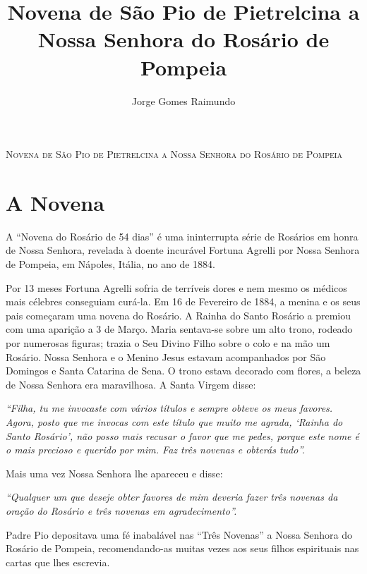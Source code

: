 \documentclass[10pt,twoside,a5paper]{article}
\title{Novena de São Pio de Pietrelcina a Nossa Senhora do Rosário de Pompeia}
\author{Jorge Gomes Raimundo}
\begin{document}
	
	
	\begin{center}\Large{\textsc{Novena de São Pio de Pietrelcina a Nossa Senhora do Rosário de Pompeia}}\bigskip\end{center}
	
	\section*{A Novena}
	
	A ``Novena do Rosário de 54 dias'' é uma ininterrupta série de Rosários em honra de Nossa Senhora, revelada à doente incurável Fortuna Agrelli por Nossa Senhora de Pompeia, em Nápoles, Itália, no ano de 1884.
	
	Por 13 meses Fortuna Agrelli sofria de terríveis dores e nem mesmo os médicos mais célebres conseguiam curá-la. Em 16 de Fevereiro de 1884, a menina e os seus pais começaram uma novena do Rosário. A Rainha do Santo Rosário a premiou com uma aparição a 3 de Março. Maria sentava-se sobre um alto trono, rodeado por numerosas figuras; trazia o Seu Divino Filho sobre o colo e na mão um Rosário. Nossa Senhora e o Menino Jesus estavam acompanhados por São Domingos e Santa Catarina de Sena. O trono estava decorado com flores, a beleza de Nossa Senhora era maravilhosa. A Santa Virgem disse:
	
	\setlength{\leftskip}{3cm}
	
	\textit{``Filha, tu me invocaste com vários títulos e sempre obteve os meus favores. Agora, posto que me invocas com este título que muito me agrada, `Rainha do Santo Rosário', não posso mais recusar o favor que me pedes, porque este nome é o mais precioso e querido por mim. Faz três novenas e obterás tudo''.}
	
	\setlength{\leftskip}{0pt}
	
	Mais uma vez Nossa Senhora lhe apareceu e disse:
	
	\setlength{\leftskip}{3cm}
	
	\textit{``Qualquer um que deseje obter favores de mim deveria fazer três novenas da oração do Rosário e três novenas em agradecimento''.}
	
	\setlength{\leftskip}{0pt}
	
	Padre Pio depositava uma fé inabalável nas ``Três Novenas'' a Nossa Senhora do Rosário de Pompeia, recomendando-as muitas vezes aos seus filhos espirituais nas cartas que lhes escrevia.
	
\end{document}
